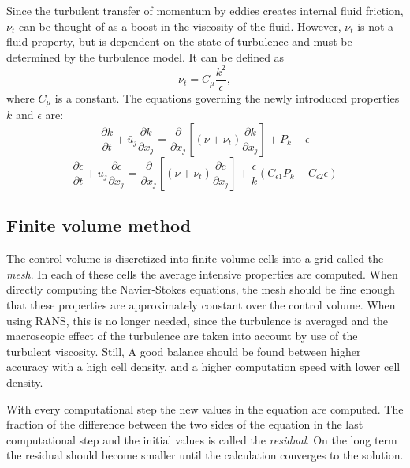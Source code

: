 Since the turbulent transfer of momentum by eddies creates internal fluid friction, $\nu_t$ can be thought of as a boost in the viscosity of the fluid. However, $\nu_t$ is not a fluid property, but is dependent on the state of turbulence and must be determined by the turbulence model. It can be defined as 
\begin{equation}\label{eq:NU}
\nu_t = C_\mu\frac{k^2}{\epsilon},
\end{equation}
where $C_\mu$ is a constant. The equations governing the newly introduced properties $k$ and $\epsilon$ are:
\begin{equation}\label{eq:ke1}
\frac{\partial k}{\partial t} + \bar{u}_j\frac{\partial k}{\partial x_j} = \frac{\partial}{\partial x_j} \left[(\nu + \nu_t) \frac{\partial k }{\partial x_j}\right] + P_k - \epsilon
\end{equation}
\begin{equation}\label{eq:ke2}
\frac{\partial \epsilon}{\partial t} + \bar{u}_j\frac{\partial \epsilon}{\partial x_j} = \frac{\partial}{\partial x_j} \left[(\nu + \nu_t) \frac{\partial e}{\partial x_j}\right] + \frac{\epsilon}{k}(C_{\epsilon 1}P_k - C_{\epsilon 2}\epsilon)
\end{equation}


\subsection{Finite volume method}

The control volume is discretized into finite volume cells into a grid called the \emph{mesh}. In each of these cells the average intensive properties are computed. When directly computing the Navier-Stokes equations, the mesh should be fine enough that these properties are approximately constant over the control volume. When using RANS, this is no longer needed, since the turbulence is averaged and the macroscopic effect of the turbulence are taken into account by use of the turbulent viscosity. Still, A good balance should be found between higher accuracy with a high cell density, and a higher computation speed with lower cell density. 

With every computational step the new values in the equation are computed. The fraction of the difference between the two sides of the equation in the last computational step and the initial values is called the \emph{residual}. On the long term the residual should become smaller until the calculation converges to the solution. 

